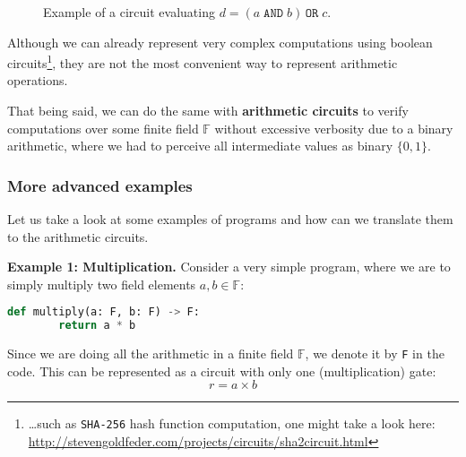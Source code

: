 \documentclass[../lecture-notes.tex]{subfiles}
\begin{document}
\begin{figure}[h!]
    \centering
    \caption{Example of a circuit evaluating $d = (a \;\texttt{AND}\; b) \,\texttt{OR}\; c$.}
    \label{fig:bool-circuit}
\end{figure}

Although we can already represent very complex computations using boolean circuits\footnote{\ldots such as \texttt{SHA-256} hash function computation, one might take a look here: \url{http://stevengoldfeder.com/projects/circuits/sha2circuit.html}}, they are not the most convenient way to represent arithmetic operations. 

That being said, we can do the same with \textbf{arithmetic circuits} to verify computations over some finite field $\mathbb{F}$ without excessive 
verbosity due to a binary arithmetic, where we had to perceive all intermediate
values as binary $\{0,1\}$.

\subsubsection{More advanced examples}

Let us take a look at some examples of programs and how can we translate them to the arithmetic
circuits. 

\textbf{Example 1: Multiplication.} Consider a very simple program, where we are to simply multiply two field elements $a,b \in \mathbb{F}$:

\begin{lstlisting}[language=Python,numbers=none]
    def multiply(a: F, b: F) -> F:
        return a * b
\end{lstlisting}

Since we are doing all the arithmetic in a finite field $\mathbb{F}$, we denote it by \texttt{F} in the code. This can be represented as a circuit with only one (multiplication) gate:
\begin{equation*}
    r = a \times b
\end{equation*}    
\end{document}
